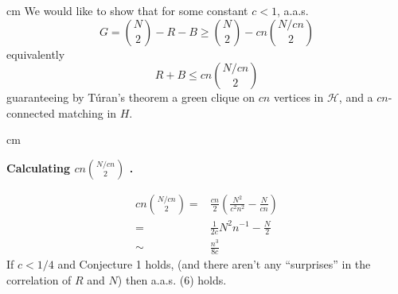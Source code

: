 \documentclass{article}
\begin{document}
 cm
We would like to show that for some constant $c < 1$, a.a.s. \[G = {N\choose 2} - R - B \geq {N\choose 2} - cn{N/cn\choose 2}\] equivalently
\begin{equation}
	R + B \leq cn{N/cn\choose 2}
\end{equation}
guaranteeing by T\'{u}ran's theorem a green clique on $cn$ vertices in $\mathcal{H}$, and a $cn$-connected matching in $H$.

 cm

\noindent\textbf{Calculating $\displaystyle cn{N/cn\choose 2}$ .}

\begin{eqnarray}
	cn{N/cn\choose 2} =&\displaystyle \frac{cn}{2}\left(\frac{N^2}{c^2n^2} - \frac{N}{cn}\right)\\
	=& \displaystyle \frac{1}{2c}N^2n^{-1} - \frac{N}{2}\\
	\sim&   \displaystyle \frac{n^3}{8c}
\end{eqnarray}
If $c < 1/4$ and Conjecture 1 holds, (and there aren't any ``surprises'' in the correlation of $R$ and $N$) then a.a.s. (6) holds.
\end{document}

